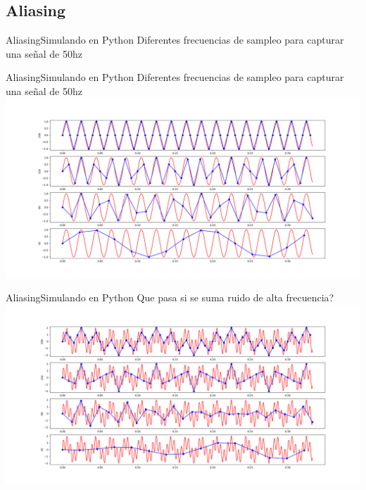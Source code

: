 \begin{darkframes}
    \subsection{Aliasing}
   \begin{frame}{Aliasing}{Simulando en Python}
      \handsonicon
      Diferentes frecuencias de sampleo para capturar una señal de 50hz
      
      \vfill
   \end{frame}
   \begin{frame}{Aliasing}{Simulando en Python}
      Diferentes frecuencias de sampleo para capturar una señal de 50hz
      \center\includegraphics[width=1.0\textwidth]{1_clase/teorema_sampleo}
      \vfill
   \end{frame}
   \begin{frame}{Aliasing}{Simulando en Python}
      Que pasa si se suma ruido de alta frecuencia?
      \center\includegraphics[width=1.0\textwidth]{1_clase/teorema_sampleo2}
      \vfill
   \end{frame}

\end{darkframes}
